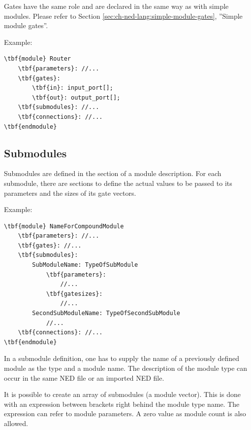 

Gates have the same role and are declared in the same way
as with simple modules. Please refer to Section
\ref{sec:ch-ned-lang:simple-module-gates}, ''Simple module gates''.


Example:
\begin{Verbatim}[commandchars=\\\{\}]
\tbf{module} Router
    \tbf{parameters}: //...
    \tbf{gates}:
        \tbf{in}: input_port[];
        \tbf{out}: output_port[];
    \tbf{submodules}: //...
    \tbf{connections}: //...
\tbf{endmodule}
\end{Verbatim}





\subsection{Submodules}


Submodules are defined in the
 section of a
module description. For each submodule, there are sections to define
the actual values to be passed to its parameters and the sizes of its
gate vectors.

Example:

\begin{Verbatim}[commandchars=\\\{\}]
\tbf{module} NameForCompoundModule
    \tbf{parameters}: //...
    \tbf{gates}: //...
    \tbf{submodules}:
        SubModuleName: TypeOfSubModule
            \tbf{parameters}:
                //...
            \tbf{gatesizes}:
                //...
        SecondSubModuleName: TypeOfSecondSubModule
            //...
    \tbf{connections}: //...
\tbf{endmodule}
\end{Verbatim}

In a submodule definition, one has to supply the name of a previously
defined module as the type and a module name. The description of the
module type can occur in the same NED file or an imported NED file.




It is possible to create an array of
submodules (a module
vector).  This is done with an expression between
brackets right behind the module type name. The expression can refer
to module parameters.  A zero value as module count is also allowed.

